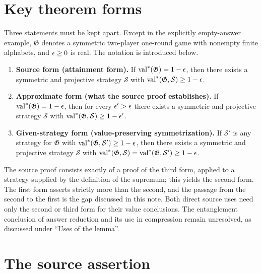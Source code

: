 \documentclass[11pt]{article}
\newcommand{\val}{\operatorname{val}}
\newcommand{\game}{\mathfrak{G}}
\newcommand{\strategy}{\mathcal{S}}
\begin{document}
\section{Key theorem forms}

Three statements must be kept apart. Except in the explicitly empty-answer
example, $\game$ denotes a symmetric two-player one-round game with nonempty
finite alphabets, and $\epsilon \ge 0$ is real. The notation is introduced below.

\begin{enumerate}
  \item \textbf{Source form (attainment form).}  If
  $\val^*(\game) = 1-\eps$, then there exists a symmetric and projective
  strategy $\strategy$ with $\val^*(\game, \strategy) \ge 1-\eps$.
  \item \textbf{Approximate form (what the source proof establishes).}  If
  $\val^*(\game) = 1-\eps$, then for every $\epsilon' > \epsilon$ there exists a
  symmetric and projective strategy $\strategy$ with
  $\val^*(\game, \strategy) \ge 1-\eps'$.
  \item \textbf{Given-strategy form (value-preserving symmetrization).}  If
  $\strategy'$ is any strategy for $\game$ with
  $\val^*(\game, \strategy') \ge 1-\eps$, then there exists a symmetric and
  projective strategy $\strategy$ with
  $\val^*(\game, \strategy) = \val^*(\game, \strategy') \ge 1-\eps$.
\end{enumerate}

The source proof consists exactly of a proof of the third form, applied to a
strategy supplied by the definition of the supremum; this yields the second
form. The first form asserts strictly more than the second, and the passage
from the second to the first is the gap discussed in this note. Both direct
source uses need only the second or third form for their value conclusions.
The entanglement conclusion of answer reduction and its use in compression
remain unresolved, as discussed under ``Uses of the lemma''.

\section{The source assertion}
\end{document}
